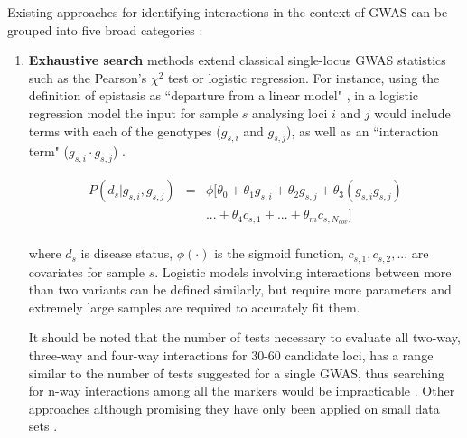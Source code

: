 Existing approaches for identifying interactions in the context of GWAS can be grouped into five broad categories \cite{li2011detecting}:
\begin{enumerate}
	\item \textbf{Exhaustive search} methods extend classical single-locus GWAS statistics such as the Pearson's $\chi^2$ test or logistic regression.
For instance, using the definition of epistasis as ``departure from a linear model" \cite{cordell2009detecting}, in a logistic regression model the input for sample $s$ analysing loci $i$ and $j$ would include terms with each of the genotypes ($g_{s,i}$ and $g_{s,j}$), as well as an ``interaction term" ($g_{s,i} \cdot g_{s,j}$) \cite{cordell2002epistasis}. 

\begin{eqnarray*} \label{eq:gwasLogRegH1}
    P( d_s | g_{s,i},g_{s,j}) & = & \phi[ \theta_0 + \theta_1 g_{s,i} + \theta_2 g_{s,j} + \theta_3 (g_{s,i} g_{s,j}) \\
    & & ... + \theta_4 c_{s,1} + ... + \theta_m c_{s,N_{cov}} ] \\
\end{eqnarray*}

where $d_s$ is disease status, $\phi(\cdot)$ is the sigmoid function, $c_{s,1}, c_{s,2}, ... $ are covariates for sample $s$.
Logistic models involving interactions between more than two variants can be defined similarly, but require more parameters and extremely large samples are required to accurately fit them.

It should be noted that the number of tests necessary to evaluate all two-way, three-way and four-way interactions for 30-60 candidate loci, has a range similar to the number of tests suggested for a single GWAS, thus searching for n-way interactions among all the markers would be impracticable \cite{culverhouse2002perspective}.
Other approaches \cite{nelson2001combinatorial, culverhouse2004detecting, ritchie2001multifactor, cook2004tree, zheng2006backward}
although promising they have only been applied on small data sets \cite{zhang2007bayesian}.


\end{enumerate}
